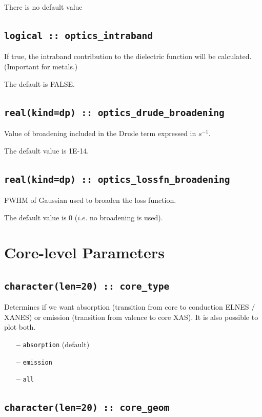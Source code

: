 \documentclass[a4paper,11pt,twoside]{book}
\begin{document}
{There is no default value

\subsection[optics\_intraband]{\tt logical :: optics\_intraband}
If true, the intraband contribution to the dielectric function will be calculated.  (Important for metals.)    

The default is FALSE.

\subsection[optics\_drude\_broadening]{\tt real(kind=dp) :: optics\_drude\_broadening}
Value of broadening included in the Drude term expressed in $s^{-1}$.  

The default value is 1E-14.  

\subsection[optics\_lossfn\_broadening]{\tt real(kind=dp) :: optics\_lossfn\_broadening}
FWHM of Gaussian used to broaden the loss function.  

The default value is 0 ($i.e.$ no broadening is used).  


\section{Core-level Parameters}

\subsection[core\_geom]{\tt character(len=20) :: core\_type}

Determines if we want absorption (transition from core to conduction
ELNES / XANES)
or emission (transition from valence to core XAS). It is also possible
to plot both.
\begin{itemize}
\item[{\bf --}]  \verb#absorption# (default)
\item[{\bf --}]  \verb#emission#
\item[{\bf --}]  \verb#all#
\end{itemize}

\subsection[core\_geom]{\tt character(len=20) :: core\_geom}

}
\end{document}
